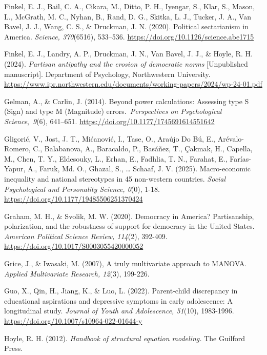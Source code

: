 \documentclass[authordate, meta, issue]{jote-new-article}
\begin{document}
	Finkel, E. J., Bail, C. A., Cikara, M., Ditto, P. H., Iyengar, S., Klar, S., Mason, L., McGrath, M. C., Nyhan, B., Rand, D. G., Skitka, L. J., Tucker, J. A., Van Bavel, J. J., Wang, C. S., \& Druckman, J. N. (2020). Political sectarianism in America. \emph{Science, 370}(6516), 533--536. \url{https://doi.org/10.1126/science.abe1715}



	Finkel, E. J., Landry, A. P., Druckman, J. N., Van Bavel, J. J., \& Hoyle, R. H. (2024). \emph{Partisan antipathy and the erosion of democratic norms }[Unpublished manuscript]. Department of Psychology, Northwestern University. \url{https://www.ipr.northwestern.edu/documents/working-papers/2024/wp-24-01.pdf}



	Gelman, A., \& Carlin, J. (2014). Beyond power calculations: Assessing type S (Sign) and type M (Magnitude) errors. \emph{Perspectives on Psychological Science}, \emph{9}(6), 641--651. \url{https://doi.org/10.1177/1745691614551642}



	Gligorić, V., Jost, J. T., Mićanović, I., Tase, O., Araújo Do Bú, E., Arévalo-Romero, C., Balabanova, A., Baracaldo, P., Basáñez, T., Çakmak, H., Capella, M., Chen, T. Y., Eldesouky, L., Erhan, E., Fadhlia, T. N., Farahat, E., Farías-Yapur, A., Faruk, Md. O., Ghazal, S., … Schaaf, J. V. (2025). Macro-economic inequality and national stereotypes in 45 non-western countries. \emph{Social Psychological and Personality Science, 0}(0), 1-18. \url{https://doi.org/10.1177/19485506251370424}



	Graham, M. H., \& Svolik, M. W. (2020). Democracy in America? Partisanship, polarization, and the robustness of support for democracy in the United States. \emph{American Political Science Review, 114}(2), 392-409. \url{https://doi.org/10.1017/S0003055420000052}



	Grice, J., \& Iwasaki, M. (2007), A truly multivariate approach to MANOVA. \emph{Applied Multivariate Research, 12}(3), 199-226.



	Guo, X., Qin, H., Jiang, K., \& Luo, L. (2022). Parent-child discrepancy in educational aspirations and depressive symptoms in early adolescence: A longitudinal study. \emph{Journal of Youth and Adolescence, 51}(10), 1983-1996. \url{https://doi.org/10.1007/s10964-022-01644-y}


	Hoyle, R. H. (2012). \emph{Handbook of structural equation modeling. }The Guilford Press.
\end{document}
